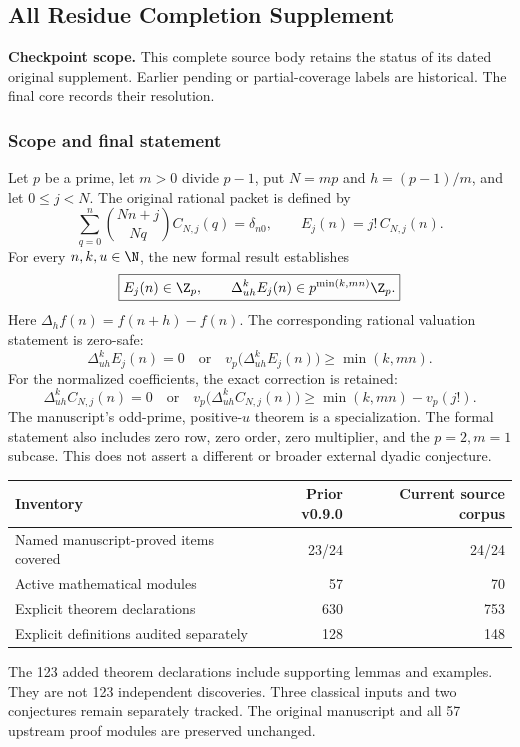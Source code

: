 \clearpage\subsection{All Residue Completion Supplement}\label{app:sup10}
\noindent\textbf{Checkpoint scope.} This complete source body retains the status of its dated original supplement. Earlier pending or partial-coverage labels are historical. The final core records their resolution.\par\medskip
\subsubsection*{Scope and final statement}
Let $p$ be a prime, let $m>0$ divide $p-1$, put $N=mp$ and $h=(p-1)/m$, and let $0\le j<N$. The original rational packet is defined by
\[
 \sum_{q=0}^{n}\binom{Nn+j}{Nq}C_{N,j}(q)=\delta_{n0},
 \qquad E_j(n)=j!\,C_{N,j}(n).
\]
For every $n,k,u\in\N$, the new formal result establishes
\[
 \boxed{E_j(n)\in\Z_p,\qquad
 \Delta_{uh}^{k}E_j(n)\in p^{\min(k,mn)}\Z_p.}
\]
Here $\Delta_h f(n)=f(n+h)-f(n)$. The corresponding rational valuation statement is zero-safe:
\[
 \Delta_{uh}^{k}E_j(n)=0\quad\text{or}\quad
 v_p\bigl(\Delta_{uh}^{k}E_j(n)\bigr)\ge\min(k,mn).
\]
For the normalized coefficients, the exact correction is retained:
\[
 \boxed{\Delta_{uh}^{k}C_{N,j}(n)=0\quad\text{or}\quad
 v_p\bigl(\Delta_{uh}^{k}C_{N,j}(n)\bigr)\ge\min(k,mn)-v_p(j!).}
\]
The manuscript's odd-prime, positive-$u$ theorem is a specialization. The formal statement also includes zero row, zero order, zero multiplier, and the $p=2,m=1$ subcase. This does not assert a different or broader external dyadic conjecture.

\begin{center}\begin{tabular}{lrr}\toprule
Inventory & Prior v0.9.0 & Current source corpus\\\midrule
Named manuscript-proved items covered &23/24&24/24\\
Active mathematical modules &57&70\\
Explicit theorem declarations &630&753\\
Explicit definitions audited separately &128&148\\\bottomrule
\end{tabular}\end{center}
The 123 added theorem declarations include supporting lemmas and examples. They are not 123 independent discoveries. Three classical inputs and two conjectures remain separately tracked. The original manuscript and all 57 upstream proof modules are preserved unchanged.

